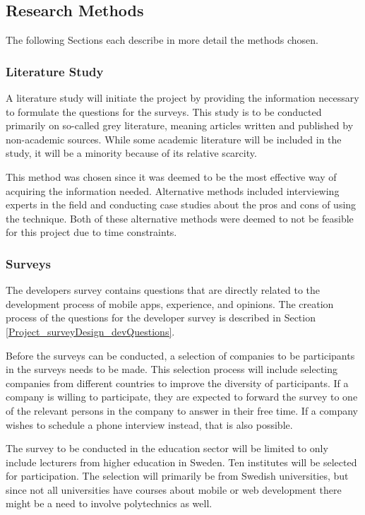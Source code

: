 \documentclass[a4paper,12pt]{article}
\begin{document}
\subsection{Research Methods}
\label{Method_methods}
The following Sections each describe in more detail the methods chosen.

\subsubsection{Literature Study}
\label{Method_methods_study}
A literature study will initiate the project by providing the information necessary to formulate the questions for the surveys. This study is to be conducted primarily on so-called grey literature, meaning articles written and published by non-academic sources. While some academic literature will be included in the study, it will be a minority because of its relative scarcity. 

This method was chosen since it was deemed to be the most effective way of acquiring the information needed. Alternative methods included interviewing experts in the field and conducting case studies about the pros and cons of using the technique. Both of these alternative methods were deemed to not be feasible for this project due to time constraints.

\subsubsection{Surveys}
\label{Method_methods_surveys}
The developers survey contains questions that are directly related to the development process of mobile apps, experience, and opinions. The creation process of the questions for the developer survey is described in Section \ref{Project_surveyDesign_devQuestions}.

Before the surveys can be conducted, a selection of companies to be participants in the surveys needs to be made. This selection process will include selecting companies from different countries to improve the diversity of participants. If a company is willing to participate, they are expected to forward the survey to one of the relevant persons in the company to answer in their free time. If a company wishes to schedule a phone interview instead, that is also possible.

The survey to be conducted in the education sector will be limited to only include lecturers from higher education in Sweden. Ten institutes will be selected for participation. The selection will primarily be from Swedish universities, but since not all universities have courses about mobile or web development there might be a need to involve polytechnics as well.
\end{document}
